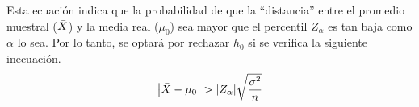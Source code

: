 Esta ecuación indica que la probabilidad de que la ``distancia'' entre el promedio muestral ($\bar{X}$) y la media real ($\mu_0$) sea mayor que el percentil $Z_\alpha$ es tan baja como $\alpha$ lo sea.
Por lo tanto, se optará por rechazar $h_0$ si se verifica la siguiente inecuación.
\begin{equation*}
    {\left| {\bar{X}-\mu_0} \right|} > {\left| {Z_\alpha} \right|} \sqrt{\dfrac{\sigma^2}{n}}
\end{equation*}


